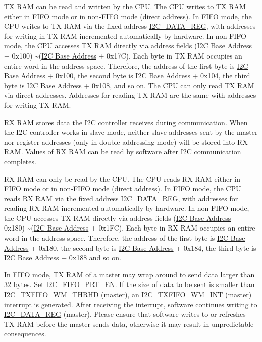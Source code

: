 \documentclass[main\_\_EN.tex]{subfiles}
\begin{document}
TX RAM can be read and written by the CPU. The CPU writes to TX RAM either in FIFO mode or in non-FIFO mode (direct address). In FIFO mode, the CPU writes to TX RAM via the fixed address \hyperref[regdesc:I2CDATAREG]{I2C\_DATA\_REG}, with addresses for writing in TX RAM incremented automatically by hardware. In non-FIFO mode, the CPU accesses TX RAM directly via address fields (\hyperref[tab:sysmem-base-address]{I2C Base Address} + 0x100) \textasciitilde (\hyperref[tab:sysmem-base-address]{I2C Base Address} + 0x17C). Each byte in TX RAM occupies an entire word in the address space. Therefore, the address of the first byte is \hyperref[tab:sysmem-base-address]{I2C Base Address} + 0x100, the second byte is \hyperref[tab:sysmem-base-address]{I2C Base Address} + 0x104, the third byte is \hyperref[tab:sysmem-base-address]{I2C Base Address} + 0x108, and so on. The CPU can only read TX RAM via direct addresses. 
Addresses for reading TX RAM are the same with addresses for writing TX RAM.

RX RAM stores data the I2C controller receives during communication. When the I2C controller works in slave mode, neither slave addresses sent by the master nor register addresses (only in double addressing mode) will be stored into RX RAM. Values of RX RAM can be read by software after I2C communication completes.

RX RAM can only be read by the CPU. The CPU reads RX RAM either in FIFO mode or in non-FIFO mode (direct address). In FIFO mode, the CPU reads RX RAM via the fixed address \hyperref[regdesc:I2CDATAREG]{I2C\_DATA\_REG}, with addresses for reading RX RAM incremented automatically by hardware. In non-FIFO mode, the CPU accesses TX RAM directly via address fields (\hyperref[tab:sysmem-base-address]{I2C Base Address} + 0x180) \textasciitilde (\hyperref[tab:sysmem-base-address]{I2C Base Address} + 0x1FC). Each byte in RX RAM occupies an entire word in the address space. Therefore, the address of the first byte is \hyperref[tab:sysmem-base-address]{I2C Base Address} + 0x180, the second byte is \hyperref[tab:sysmem-base-address]{I2C Base Address} + 0x184, the third byte is \hyperref[tab:sysmem-base-address]{I2C Base Address} + 0x188 and so on.

In FIFO mode, TX RAM of a master may wrap around to send data larger than 32 bytes. Set \hyperref[fielddesc:I2CFIFOPRTEN]{I2C\_FIFO\_PRT\_EN}. If the size of data to be sent is smaller than \hyperref[fielddesc:I2CTXFIFOWMTHRHD]{I2C\_TXFIFO\_WM\_THRHD} (master), an I2C\_TXFIFO\_WM\_INT (master) interrupt is generated. After receiving the interrupt, software continues writing to \hyperref[regdesc:I2CDATAREG]{I2C\_DATA\_REG} (master). Please ensure that software writes to or refreshes TX RAM before the master sends data, otherwise it may result in unpredictable consequences.
\end{document}
